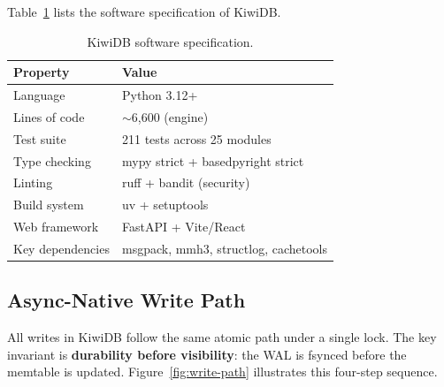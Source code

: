 \documentclass[conference]{IEEEtran}
\begin{document}
Table~\ref{tab:system-spec} lists the software specification of KiwiDB.

\begin{table}[t]
\centering
\caption{KiwiDB software specification.}
\label{tab:system-spec}
\begin{tabular}{@{}ll@{}}
\toprule
\textbf{Property} & \textbf{Value} \\
\midrule
Language & Python 3.12+ \\
Lines of code & $\sim$6,600 (engine) \\
Test suite & 211 tests across 25 modules \\
Type checking & mypy strict + basedpyright strict \\
Linting & ruff + bandit (security) \\
Build system & uv + setuptools \\
Web framework & FastAPI + Vite/React \\
Key dependencies & msgpack, mmh3, structlog, cachetools \\
\bottomrule
\end{tabular}
\end{table}

\subsection{Async-Native Write Path}

All writes in KiwiDB follow the same atomic path under a single lock. The key invariant is \textbf{durability before visibility}: the WAL is fsynced before the memtable is updated. Figure~\ref{fig:write-path} illustrates this four-step sequence.
\end{document}
